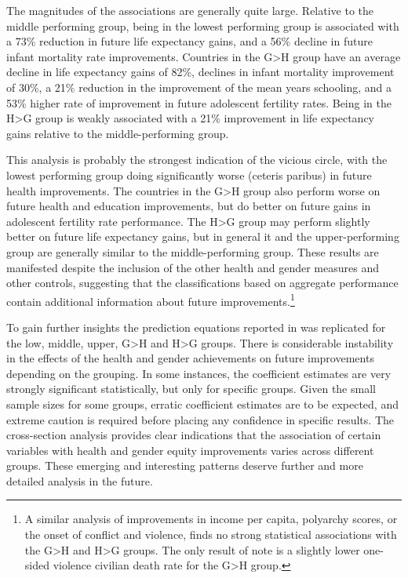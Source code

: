 \documentclass[12pt]{article}
\begin{document}
The magnitudes of the associations are generally quite large. Relative to the middle performing group, being in the lowest performing group is associated with a 73\% reduction in future life expectancy gains, and a 56\% decline in future infant mortality rate improvements. Countries in the G>H group have an average decline in life expectancy gains of 82\%, declines  in infant mortality improvement of 30\%, a 21\% reduction in the improvement of the mean years schooling, and a 53\% higher rate of improvement in future adolescent fertility rates. Being in the H>G group is weakly associated with a 21\% improvement in life expectancy gains relative to the middle-performing group.

This analysis is probably the strongest indication of the vicious circle, with the lowest performing group doing significantly worse (ceteris paribus) in future health improvements. The countries in the G>H group also perform worse on future health and education improvements, but do better on future gains in adolescent fertility rate performance. The H>G group may perform slightly better on future life expectancy gains, but in general it and the upper-performing group are generally similar to the middle-performing group. These results are manifested despite the inclusion of the other health and gender measures and other controls, suggesting that the classifications based on aggregate performance contain additional information about future improvements.\footnote{
A similar analysis of improvements in income per capita, polyarchy scores, or the onset of conflict and violence, finds no strong statistical associations with the G>H and H>G groups. The only result of note is a slightly lower one-sided violence civilian death rate for the G>H group.}

To gain further insights the prediction equations reported in  was replicated for the low, middle, upper, G>H and H>G groups. There is considerable instability in the effects of the health and gender achievements on future improvements depending on the grouping. In some instances, the coefficient estimates are very strongly significant statistically, but only for specific groups. Given the small sample sizes for some groups, erratic coefficient estimates are to be expected, and extreme caution is required before placing any confidence in specific results.  The cross-section analysis provides clear indications that the association of certain variables with health and gender equity improvements varies across different groups. These emerging and interesting patterns deserve further and more detailed analysis in the future.
\end{document}
